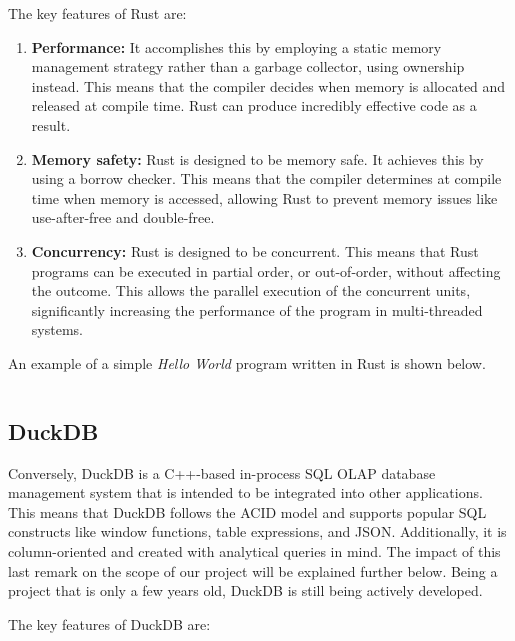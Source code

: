 The key features of Rust are:

\begin{enumerate}
    \itemsep1em
    \item \textbf{Performance:} It accomplishes this by employing a static memory management strategy rather than a garbage collector, using ownership instead. This means that the compiler decides when memory is allocated and released at compile time. Rust can produce incredibly effective code as a result.
    \item \textbf{Memory safety:} Rust is designed to be memory safe. It achieves this by using a borrow checker. This means that the compiler determines at compile time when memory is accessed, allowing Rust to prevent memory issues like use-after-free and double-free.
    \item \textbf{Concurrency:} Rust is designed to be concurrent. This means that Rust programs can be executed in partial order, or out-of-order, without affecting the outcome. This allows the parallel execution of the concurrent units, significantly increasing the performance of the program in multi-threaded systems.
\end{enumerate}

An example of a simple \textit{Hello World} program written in Rust is shown below.

\begin{code}
    \inputminted{rust}{code/listings/9-1_helloWorld.rs}
\end{code}

\subsection{DuckDB}

Conversely, DuckDB is a C++-based in-process SQL OLAP database management system that is intended to be integrated into other applications. This means that DuckDB follows the ACID model and supports popular SQL constructs like window functions, table expressions, and JSON. Additionally, it is column-oriented and created with analytical queries in mind. The impact of this last remark on the scope of our project will be explained further below. Being a project that is only a few years old, DuckDB is still being actively developed.

The key features of DuckDB are:

